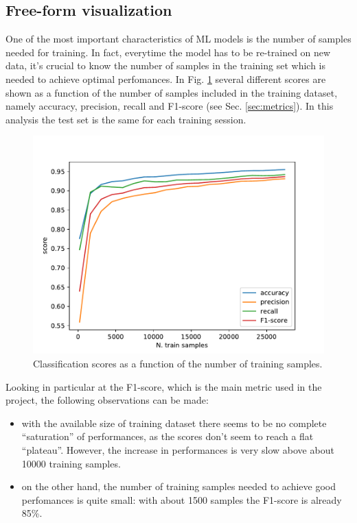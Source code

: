 \documentclass[a4paper,12pt]{article} %
\begin{document}
\subsection{Free-form visualization}
One of the most important characteristics of ML models is the number
of samples needed for training.
In fact, everytime the model has to be re-trained on new data, it's crucial to know
the number of samples in the training set which is needed to achieve optimal perfomances.
In Fig. \ref{fig:scores_vs_nsamples} several different scores are shown as a function
of the number of samples included in the training dataset, namely accuracy, precision, recall and F1-score
(see Sec. \ref{sec:metrics}).
In this analysis the test set is the same for each training session.
\begin{figure}[h!]
\caption{Classification scores as a function of the number of training samples. \label{fig:scores_vs_nsamples}}
\begin{center}
\includegraphics[scale=0.8]{plots/scores_vs_nsamples.pdf}
\end{center}
\end{figure}
Looking in particular at the F1-score, which is the main metric used in the project,
the following observations can be made:
\begin{itemize}
    \item with the available size of training dataset there seems to be no complete ``saturation'' of performances,
    as the scores don't seem to reach a flat ``plateau''.
    However, the increase in performances is very slow above about 10000 training samples.
    \item on the other hand, the number of training samples needed to achieve good perfomances is quite small:
    with about 1500 samples the F1-score is already 85\%.
\end{itemize}
\end{document}
